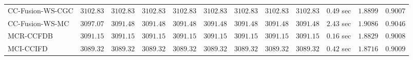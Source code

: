\begin{table}[H]
\begin{tabular}{lrrrrrrrrrrr}
    CC-Fusion-WS-CGC & $      3102.83$ & $      3102.83$ & $      3102.83$ & $      3102.83$ & $      3102.83$ & $      3102.83$ & $      3102.83$ & $      3102.83$ & $         0.49$ sec    & $       1.8899$  & $       0.9007$ \\ 
     CC-Fusion-WS-MC & $      3097.07$ & $      3091.48$ & $      3091.48$ & $      3091.48$ & $      3091.48$ & $      3091.48$ & $      3091.48$ & $      3091.48$ & $         2.43$ sec    & $       1.9086$  & $       0.9046$ \\ 
\cmidrule{1-1} 
           MCR-CCFDB & $      3091.15$ & $      3091.15$ & $      3091.15$ & $      3091.15$ & $      3091.15$ & $      3091.15$ & $      3091.15$ & $      3091.15$ & $         0.16$ sec    & $       1.8829$  & $       0.9008$ \\ 
\cmidrule{1-1} 
           MCI-CCIFD & $      3089.32$ & $      3089.32$ & $      3089.32$ & $      3089.32$ & $      3089.32$ & $      3089.32$ & $      3089.32$ & $      3089.32$ & $         0.42$ sec    & $       1.8716$  & $       0.9009$ \\ 
\bottomrule
\end{tabular}
\end{table}

